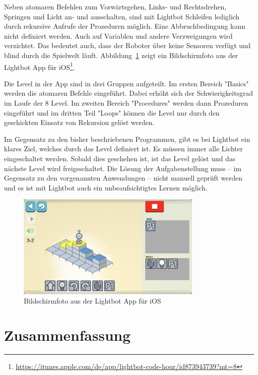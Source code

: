 Neben atomaren Befehlen zum Vorwärtsgehen, Links- und Rechtsdrehen, Springen und Licht an- und ausschalten, sind mit Lightbot Schleifen lediglich durch rekursive Aufrufe der Prozeduren möglich. Eine Abbruchbedingung kann nicht definiert werden. Auch auf Variablen und andere Verzweigungen wird verzichtet. Das bedeutet auch, dass der Roboter über keine Sensoren verfügt und blind durch die Spielwelt läuft. Abbildung~\ref{fig:related:lightbot:screenshot} zeigt ein Bildschirmfoto aus der Lightbot App für iOS\footnote{\url{https://itunes.apple.com/de/app/lightbot-code-hour/id873943739?mt=8}}.

Die Level in der App sind in drei Gruppen aufgeteilt. Im ersten Bereich "Basics" werden die atomaren Befehle eingeführt. Dabei erhöht sich der Schwierigkeitsgrad im Laufe der 8 Level. Im zweiten Bereich "Procedures" werden dann Prozeduren eingeführt und im dritten Teil "Loops" können die Level nur durch den geschickten Einsatz von Rekursion gelöst werden.

Im Gegensatz zu den bisher beschriebenen Programmen, gibt es bei Lightbot ein klares Ziel, welches durch das Level definiert ist. Es müssen immer alle Lichter eingeschaltet werden. Sobald dies geschehen ist, ist das Level gelöst und das nächste Level wird freigeschaltet. Die Lösung der Aufgabenstellung muss -- im Gegensatz zu den vorgenannten Anwendungen -- nicht manuell geprüft werden und es ist mit Lightbot auch ein unbeaufsichtigtes Lernen möglich.

\begin{figure}
    \centering
    \includegraphics[width=0.8\textwidth]{gfx/related-lightbot-screenshot.png}
    \caption{Bildschirmfoto aus der Lightbot App für iOS}
    \label{fig:related:lightbot:screenshot}
\end{figure}

\section{Zusammenfassung}
\label{sec:related:summary}

